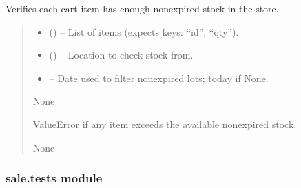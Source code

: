 \documentclass[a4paper,11pt,spanish]{sphinxmanual}
\begin{document}
\begin{fulllineitems}
\label{\detokenize{api/sale/sale.services:sale.services.verify_stock_per_item}}
\pysigstartsignatures
\pysiglinewithargsret
{}
{\sphinxparamcomma {}\sphinxparamcomma {}}
{}
\pysigstopsignatures
\sphinxAtStartPar
Verifies each cart item has enough non\sphinxhyphen{}expired stock in the store.
\begin{quote}\begin{description}
\begin{itemize}
\item {} 
\sphinxAtStartPar
{} (\sphinxstyleliteralemphasis{\sphinxupquote{{[}}}\sphinxstyleliteralemphasis{\sphinxupquote{{]}}}) – List of items (expects keys: “id”, “qty”).

\item {} 
\sphinxAtStartPar
{} ({\hyperref[\detokenize{api/inventory/inventory.models:inventory.models.Location}]{}}) – Location to check stock from.

\item {} 
\sphinxAtStartPar
{} – Date used to filter non\sphinxhyphen{}expired lots; today if None.

\end{itemize}

\sphinxAtStartPar
None

\sphinxAtStartPar
ValueError if any item exceeds the available non\sphinxhyphen{}expired stock.

\sphinxAtStartPar
None

\end{description}\end{quote}

\end{fulllineitems}


\sphinxstepscope


\subsubsection{sale.tests module}
\label{\detokenize{api/sale/sale.tests:module-sale.tests}}\label{\detokenize{api/sale/sale.tests:sale-tests-module}}\label{\detokenize{api/sale/sale.tests::doc}}
\sphinxstepscope
\end{document}
